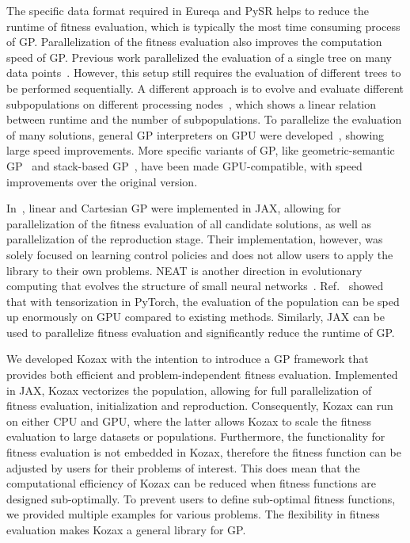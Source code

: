 The specific data format required in Eureqa and PySR helps to reduce the runtime of fitness evaluation, which is typically the most time consuming process of GP. Parallelization of the fitness evaluation also improves the computation speed of GP. Previous work parallelized the evaluation of a single tree on many data points~\cite{harding2007fast}. However, this setup still requires the evaluation of different trees to be performed sequentially. A different approach is to evolve and evaluate different subpopulations on different processing nodes~\cite{andre1998parallel, oussaidene1997parallel}, which shows a linear relation between runtime and the number of subpopulations. To parallelize the evaluation of many solutions, general GP interpreters on GPU were developed~\cite{langdon2008simd, robilliard2009genetic, cano2014gpu, langdon2010many}, showing large speed improvements. More specific variants of GP, like geometric-semantic GP~\cite{trujillo2022gsgp, castelli2019gsgp} and stack-based GP~\cite{sathia2021accelerating, chitty2017faster}, have been made GPU-compatible, with speed improvements over the original version. 

In~\cite{nadizar2024naturally}, linear and Cartesian GP were implemented in JAX, allowing for parallelization of the fitness evaluation of all candidate solutions, as well as parallelization of the reproduction stage. Their implementation, however, was solely focused on learning control policies and does not allow users to apply the library to their own problems. NEAT is another direction in evolutionary computing that evolves the structure of small neural networks~\cite{stanley2002evolving}. Ref.~\cite{wang2025evogp} showed that with tensorization in PyTorch, the evaluation of the population can be sped up enormously on GPU compared to existing methods. Similarly, JAX can be used to parallelize fitness evaluation and significantly reduce the runtime of GP.

We developed Kozax with the intention to introduce a GP framework that provides both efficient and problem-independent fitness evaluation. Implemented in JAX, Kozax vectorizes the population, allowing for full parallelization of fitness evaluation, initialization and reproduction. Consequently, Kozax can run on either CPU and GPU, where the latter allows Kozax to scale the fitness evaluation to large datasets or populations. Furthermore, the functionality for fitness evaluation is not embedded in Kozax, therefore the fitness function can be adjusted by users for their problems of interest. This does mean that the computational efficiency of Kozax can be reduced when fitness functions are designed sub-optimally. To prevent users to define sub-optimal fitness functions, we provided multiple examples for various problems. The flexibility in fitness evaluation makes Kozax a general library for GP.


